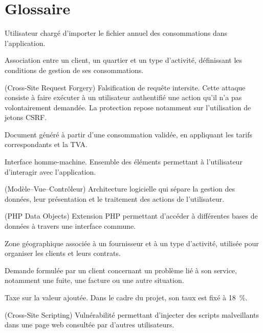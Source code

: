 
\chapter*{Glossaire}

\begin{description}[leftmargin=3.2cm,style=nextline]
  \item[Agent] Utilisateur chargé d'importer le fichier annuel des consommations dans l'application.
  
  \item[Contrat] Association entre un client, un quartier et un type d'activité, définissant les conditions de gestion de ses consommations.
  
  \item[CSRF] (Cross-Site Request Forgery) Falsification de requête intersite. Cette attaque consiste à faire exécuter à un utilisateur authentifié une action qu'il n'a pas volontairement demandée. La protection repose notamment sur l'utilisation de jetons CSRF.
  
  \item[Facture] Document généré à partir d'une consommation validée, en appliquant les tarifs correspondants et la TVA.
  
  \item[IHM] Interface homme-machine. Ensemble des éléments permettant à l'utilisateur d'interagir avec l'application.
  
  \item[MVC] (Modèle--Vue--Contrôleur) Architecture logicielle qui sépare la gestion des données, leur présentation et le traitement des actions de l'utilisateur.
  
  \item[PDO] (PHP Data Objects) Extension PHP permettant d'accéder à différentes bases de données à travers une interface commune.
  
  \item[Quartier] Zone géographique associée à un fournisseur et à un type d'activité, utilisée pour organiser les clients et leurs contrats.
  
  \item[Réclamation] Demande formulée par un client concernant un problème lié à son service, notamment une fuite, une facture ou une autre situation.
  
  \item[TVA] Taxe sur la valeur ajoutée. Dans le cadre du projet, son taux est fixé à 18~\%.
  
  \item[XSS] (Cross-Site Scripting) Vulnérabilité permettant d'injecter des scripts malveillants dans une page web consultée par d'autres utilisateurs.
\end{description}